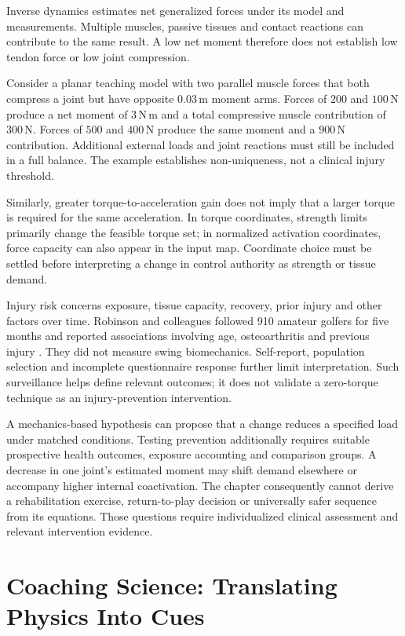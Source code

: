 Inverse dynamics estimates net generalized forces under its model and measurements. Multiple muscles, passive tissues and contact reactions can contribute to the same result. A low net moment therefore does not establish low tendon force or low joint compression.

Consider a planar teaching model with two parallel muscle forces that both compress a joint but have opposite $0.03\,\mathrm{m}$ moment arms. Forces of $200$ and $100\,\mathrm{N}$ produce a net moment of $3\,\mathrm{N\,m}$ and a total compressive muscle contribution of $300\,\mathrm{N}$. Forces of $500$ and $400\,\mathrm{N}$ produce the same moment and a $900\,\mathrm{N}$ contribution. Additional external loads and joint reactions must still be included in a full balance. The example establishes non-uniqueness, not a clinical injury threshold.

Similarly, greater torque-to-acceleration gain does not imply that a larger torque is required for the same acceleration. In torque coordinates, strength limits primarily change the feasible torque set; in normalized activation coordinates, force capacity can also appear in the input map. Coordinate choice must be settled before interpreting a change in control authority as strength or tissue demand.

Injury risk concerns exposure, tissue capacity, recovery, prior injury and other factors over time. Robinson and colleagues followed 910 amateur golfers for five months and reported associations involving age, osteoarthritis and previous injury \citep{Robinson2024Injuries}. They did not measure swing biomechanics. Self-report, population selection and incomplete questionnaire response further limit interpretation. Such surveillance helps define relevant outcomes; it does not validate a zero-torque technique as an injury-prevention intervention.

A mechanics-based hypothesis can propose that a change reduces a specified load under matched conditions. Testing prevention additionally requires suitable prospective health outcomes, exposure accounting and comparison groups. A decrease in one joint's estimated moment may shift demand elsewhere or accompany higher internal coactivation. The chapter consequently cannot derive a rehabilitation exercise, return-to-play decision or universally safer sequence from its equations. Those questions require individualized clinical assessment and relevant intervention evidence.

\section{Coaching Science: Translating Physics Into Cues}

